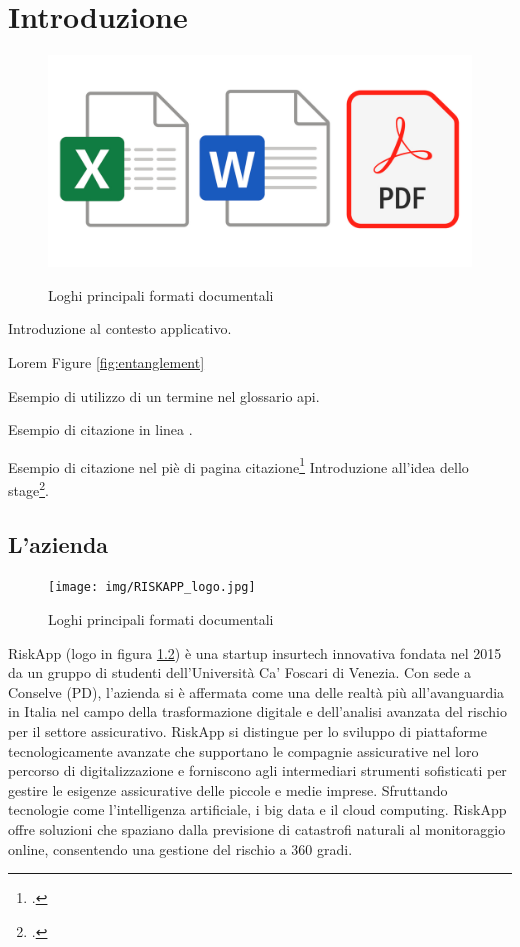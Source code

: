 \chapter{Introduzione}
\label{chap:introduzione}

\begin{figure}[H]
    \centering
    \includegraphics[alt={Logo docx, xlsx e pdf}, width=1\columnwidth]{img/format_logos.jpg}
    \caption{Loghi principali formati documentali}
    \label{fig:logos}
\end{figure}

Introduzione al contesto applicativo.

Lorem Figure \ref{fig:entanglement}

Esempio di utilizzo di un termine nel glossario \gls{api}.

Esempio di citazione in linea \cite{site:agile-manifesto}.

Esempio di citazione nel piè di pagina citazione\footcite{womak:lean-thinking}
Introduzione all'idea dello stage\footcite{article:spooky}.

\lipsum[1-2]

\section{L'azienda}

\begin{figure}[H]
    \centering
    \texttt{[image: img/RISKAPP\_logo.jpg]}
    \caption{Loghi principali formati documentali}
    \label{fig:riskapp}
\end{figure}

RiskApp (logo in figura \ref{fig:riskapp}) è una startup insurtech innovativa fondata nel 2015 da un gruppo di studenti dell'Università Ca' Foscari di Venezia. Con sede a Conselve (PD), l'azienda si è affermata come una delle realtà più all'avanguardia in Italia nel campo della trasformazione digitale e dell'analisi avanzata del rischio per il settore assicurativo. RiskApp si distingue per lo sviluppo di piattaforme tecnologicamente avanzate che supportano le compagnie assicurative nel loro percorso di digitalizzazione e forniscono agli intermediari strumenti sofisticati per gestire le esigenze assicurative delle piccole e medie imprese. Sfruttando tecnologie come l'intelligenza artificiale, i big data e il cloud computing. RiskApp offre soluzioni che spaziano dalla previsione di catastrofi naturali al monitoraggio online, consentendo una gestione del rischio a 360 gradi.





